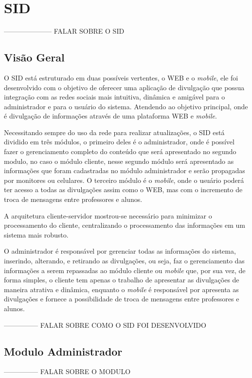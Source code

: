 \chapter[SID]{SID}
--------------------- FALAR SOBRE O SID

\section{Visão Geral}
O SID está estruturado em duas possíveis vertentes, o WEB e o \textit{mobile}, ele foi desenvolvido com o objetivo de oferecer uma aplicação de divulgação que possua integração com as redes sociais mais intuitiva, dinâmica e amigável para o administrador e para o usuário do sistema. Atendendo ao objetivo principal, onde é divulgação de informações através de uma plataforma WEB e \textit{mobile}.

Necessitando sempre do uso da rede para realizar atualizações, o SID está dividido em três módulos, o primeiro deles é o administrador, onde é possível fazer o gerenciamento completo do conteúdo que será apresentado no segundo modulo, no caso o módulo cliente, nesse segundo módulo será apresentado as informações que foram cadastradas no módulo
administrador e serão propagadas por monitores ou celulares. O terceiro módulo é o \textit{mobile}, onde o usuário poderá ter acesso a todas as divulgações assim como o WEB, mas com o incremento de troca de mensagens entre professores e alunos. 

A arquitetura cliente-servidor mostrou-se necessário para minimizar o processamento do cliente, centralizando o processamento das informações em um sistema mais robusto.

O administrador é responsável por gerenciar todas as informações do sistema, inserindo, alterando, e retirando as divulgações, ou seja, faz o gerenciamento das informações a serem repassadas ao módulo cliente ou \textit{mobile} que, por sua vez, de forma simples, o cliente tem apenas o trabalho de apresentar as divulgações de maneira atrativa e dinâmica, enquanto o \textit{mobile} é responsável por apresenta as divulgações e fornece a possibilidade de troca de mensagens entre professores e alunos. 


--------------- FALAR SOBRE COMO O SID FOI DESENVOLVIDO
\section{Modulo Administrador}
--------------- FALAR SOBRE O MODULO

